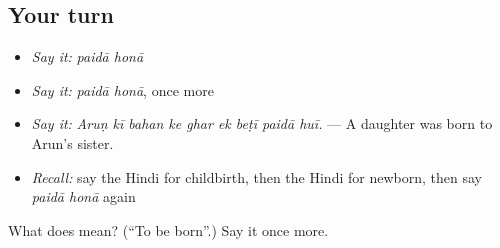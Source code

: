 \subsection*{Your turn}
\begin{itemize}
\raggedright
  \item \emph{Say it:} \emph{paidā honā}
  \item \emph{Say it:} \emph{paidā honā}, once more
  \item \emph{Say it:} \emph{Aruṇ kī bahan ke ghar ek beṭī paidā huī.} — A daughter was born to Arun's sister.
  \item \emph{Recall:} say the Hindi for childbirth, then the Hindi for newborn, then say \emph{paidā honā} again
\end{itemize}

\begin{tcolorbox}[breakable,colback=teal!4,colframe=teal!35!black,title={Before you move on}]
What does   mean? (\textquotedblleft{}To be born\textquotedblright{}.) Say it once more.
\end{tcolorbox}
